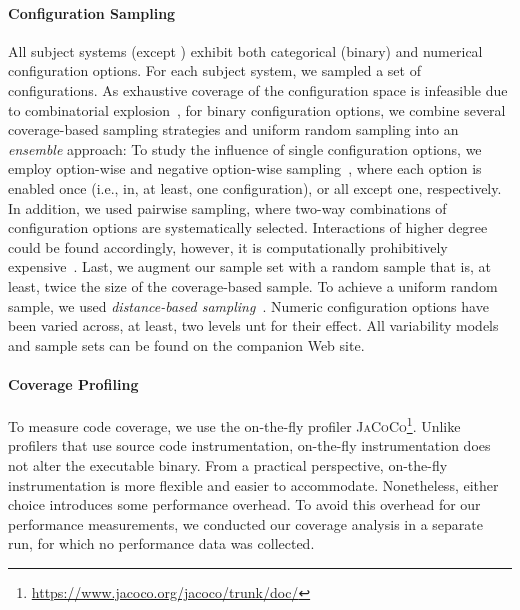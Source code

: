 \paragraph{Configuration Sampling}\label{sec:sampling}
All subject systems (except \htwo) exhibit both categorical (binary) and numerical configuration options. 
For each subject system, we sampled a set of configurations. As exhaustive coverage of the configuration space is infeasible due to combinatorial explosion~\cite{henardCombining2015}, for binary configuration options, we combine several coverage-based sampling strategies and uniform random sampling into an \emph{ensemble} approach: 
To study the influence of single configuration options, we employ option-wise and negative option-wise sampling~\cite{siegmundPerformanceinfluenceModelsHighly2015}, where each option is enabled once (i.e., in, at least, one configuration), or all except one, respectively. In addition, we used pairwise sampling, where two-way combinations of configuration options are systematically selected. Interactions of higher degree could be found accordingly, however, it is computationally prohibitively expensive~\cite{henardCombining2015}. 
Last, we augment our sample set with a random sample that is, at least, twice the size of the coverage-based sample. To achieve a uniform random sample, we used \emph{distance-based sampling}~\cite{kaltenecker_distance-based_2019}. Numeric configuration options have been varied across, at least, two levels unt for their effect. All variability models and sample sets can be found on the companion Web site.
	
\paragraph{Coverage Profiling}\label{sec:profiling}
To measure code coverage, we use the on-the-fly profiler \textsc{JaCoCo}\footnote{\url{https://www.jacoco.org/jacoco/trunk/doc/}}. Unlike profilers that use source code instrumentation, on-the-fly instrumentation does not alter the executable binary. From a practical perspective, on-the-fly instrumentation is more flexible and easier to accommodate. Nonetheless, either choice introduces some performance overhead. To avoid this overhead for our performance measurements, we conducted our coverage analysis in a separate run, for which no performance data was collected. 	
	
